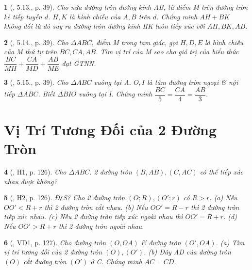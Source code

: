 \documentclass{article}
\newtheorem{baitoan}{}
\begin{document}
\begin{baitoan}[\cite{TLCT_THCS_Toan_9_hinh_hoc}, 5.13., p. 39]
	Cho nửa đường tròn đường kính AB, từ điểm M trên đường tròn kẻ tiếp tuyến $d$. $H,K$ là hình chiếu của $A,B$ trên $d$. Chứng minh $AH + BK$ không đổi từ đó suy ra đường tròn đường kính HK luôn tiếp xúc với $AH,BK,AB$.
\end{baitoan}

\begin{baitoan}[\cite{TLCT_THCS_Toan_9_hinh_hoc}, 5.14., p. 39]
	Cho $\Delta ABC$, điểm M trong tam giác, gọi $H,D,E$ là hình chiếu của M thứ tự trên $BC,CA,AB$. Tìm vị trí của M sao cho giá trị của biểu thức $\dfrac{BC}{MH} + \dfrac{CA}{MD} + \dfrac{AB}{ME}$ đạt {\rm GTNN}.
\end{baitoan}

\begin{baitoan}[\cite{TLCT_THCS_Toan_9_hinh_hoc}, 5.15., p. 39]
	Cho $\Delta ABC$ vuông tại A. $O,I$ là tâm đường tròn ngoại \& nội tiếp $\Delta ABC$. Biết $\Delta BIO$ vuông tại I. Chứng minh $\dfrac{BC}{5} = \dfrac{CA}{4} = \dfrac{AB}{3}$.
\end{baitoan}


\section{Vị Trí Tương Đối của 2 Đường Tròn}

\begin{baitoan}[\cite{Binh_boi_duong_Toan_9_tap_1}, H1, p. 126]
	Cho $\Delta ABC$. 2 đường tròn $(B,AB),(C,AC)$ có thể tiếp xúc nhau được không?
\end{baitoan}

\begin{baitoan}[\cite{Binh_boi_duong_Toan_9_tap_1}, H2, p. 126]
	{\rm Đ{\tt/}S?} Cho 2 đường tròn $(O;R),(O';r)$ có $R > r$. (a) Nếu $OO' < R + r$ thì 2 đường tròn cắt nhau. (b) Nếu $OO' = R - r$ thì 2 đường tròn tiếp xúc nhau. (c) Nếu 2 đường tròn tiếp xúc ngoài nhau thì $OO' = R + r$. (d) Nếu $OO' > R + r$ thì 2 đường tròn ngoài nhau.
\end{baitoan}

\begin{baitoan}[\cite{Binh_boi_duong_Toan_9_tap_1}, VD1, p. 127]
	Cho đường tròn $(O,OA)$ \& đường tròn $(O',OA)$. (a) Tìm vị trí tương đối của 2 đường tròn $(O),(O')$. (b) Dây AD của đường tròn $(O)$ cắt đường tròn $(O')$ ở C. Chứng minh $AC = CD$.
\end{baitoan}
\end{document}
